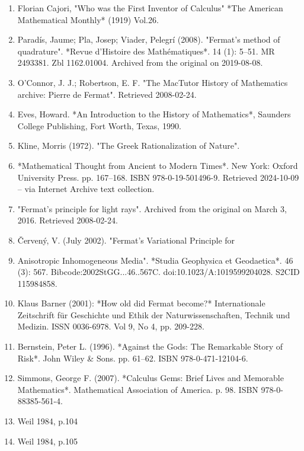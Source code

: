 \begin{enumerate}
\item Florian Cajori, "Who was the First Inventor of Calculus" *The American Mathematical Monthly* (1919) Vol.26.  
\item Paradís, Jaume; Pla, Josep; Viader, Pelegrí (2008). "Fermat's method of quadrature". *Revue d'Histoire des Mathématiques*. 14 (1): 5–51. MR 2493381. Zbl 1162.01004. Archived from the original on 2019-08-08.  
\item O'Connor, J. J.; Robertson, E. F. "The MacTutor History of Mathematics archive: Pierre de Fermat". Retrieved 2008-02-24.  
\item Eves, Howard. *An Introduction to the History of Mathematics*, Saunders College Publishing, Fort Worth, Texas, 1990.  
\item Kline, Morris (1972). "The Greek Rationalization of Nature". \item *Mathematical Thought from Ancient to Modern Times*. New York: Oxford University Press. pp. 167–168. ISBN 978-0-19-501496-9. Retrieved 2024-10-09 – via Internet Archive text collection.  
\item "Fermat's principle for light rays". Archived from the original on March 3, 2016. Retrieved 2008-02-24.  
\item Červený, V. (July 2002). "Fermat's Variational Principle for \item Anisotropic Inhomogeneous Media". *Studia Geophysica et Geodaetica*. 46 (3): 567. Bibcode:2002StGG...46..567C. doi:10.1023/A:1019599204028. S2CID 115984858.  
\item Klaus Barner (2001): *How old did Fermat become?* Internationale Zeitschrift für Geschichte und Ethik der Naturwissenschaften, Technik und Medizin. ISSN 0036-6978. Vol 9, No 4, pp. 209-228.  
\item Bernstein, Peter L. (1996). *Against the Gods: The Remarkable Story of Risk*. John Wiley & Sons. pp. 61–62. ISBN 978-0-471-12104-6.  
\item Simmons, George F. (2007). *Calculus Gems: Brief Lives and Memorable Mathematics*. Mathematical Association of America. p. 98. ISBN 978-0-88385-561-4.  
\item Weil 1984, p.104  
\item Weil 1984, p.105
\end{enumerate}